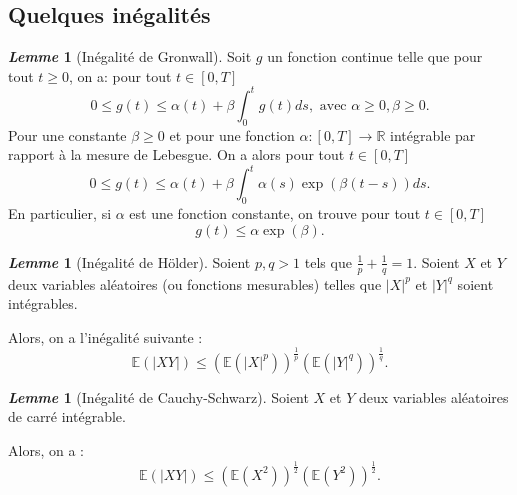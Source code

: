 \documentclass[12pt,a4paper,twoside]{book}%
\theoremstyle{definition}
\newtheorem{lem}[dfn]{\textit{Lemme}}
\numberwithin{equation}{section}
\begin{document}
\subsection{Quelques inégalités}
\begin{lem}[Inégalité de Gronwall]
	Soit $g$ un fonction continue telle que pour tout $t\geq0$, on a:
	pour tout $t\in[0,T]$
	\[
	 0\leq g(t)\leq \alpha(t)+\beta\int_{0}^{t}g(t)ds, \text{ avec } \alpha\geq0,\beta\geq0
.	\]
Pour une constante $\beta\geq0$ et pour une fonction $\alpha:[0,T]\to\mathbb{R}$ intégrable par rapport à la mesure de Lebesgue. On a alors
pour tout $t\in[0,T]$
\[
 0\leq g(t)\leq \alpha(t) +\beta\int_{0}^{t}\alpha(s)\exp(\beta(t-s))ds.
\]
En particulier, si $\alpha$ est une fonction constante, on trouve pour tout $t\in[0,T]$
\[
g(t)\leq\alpha\exp(\beta).
\]
\end{lem}
\begin{lem}[Inégalité de Hölder]
		Soient $p,q > 1$ tels que $\frac{1}{p} + \frac{1}{q} = 1$. 
	Soient $X$ et $Y$ deux variables aléatoires (ou fonctions mesurables) telles que 
	$|X|^p$ et $|Y|^q$ soient intégrables.
	
	Alors, on a l’inégalité suivante :
	\[
	\mathbb{E}(|XY|) \leq \left(\mathbb{E}(|X|^p)\right)^{\frac{1}{p}} 
	\left(\mathbb{E}(|Y|^q)\right)^{\frac{1}{q}}.
	\]
	
\end{lem}
\begin{lem}[Inégalité de Cauchy-Schwarz]
		Soient $X$ et $Y$ deux variables aléatoires de carré intégrable.
	
	Alors, on a :
	\[
	\mathbb{E}(|XY|) \leq \left(\mathbb{E}(X^2)\right)^{\frac{1}{2}} 
	\left(\mathbb{E}(Y^2)\right)^{\frac{1}{2}}.
	\]
\end{lem}
\end{document}
